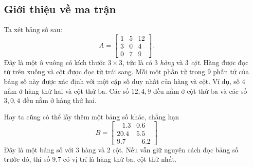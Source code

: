 \subsection{Giới thiệu về ma trận}
Ta xét bảng số sau:
\[ A=
\begin{bmatrix}
    1&5&12\\
    3&0&4\\
    0&7&9
\end{bmatrix}.
\]
Đây là một ô vuông có kích thước \(3\times 3\), tức là có \(3\) \emph{hàng} và \(3\) \emph{cột}. Hàng được đọc từ trên xuống và cột được đọc từ trái sang. Mỗi một phần tử  trong \(9\) phần tử  của bảng số này được xác định với một cặp số duy nhất của hàng và cột. Ví dụ, số \(4\) nằm ở hàng thứ hai và cột thứ ba. 
Các số \(12,4,9\) đều nằm ở cột thứ ba và các số \(3,0,4\) đều nằm ở hàng thứ hai. 

Hay ta cũng có thể lấy thêm một bảng số khác, chẳng hạn
\[B=\begin{bmatrix}
    -1.3&0.6\\
    20.4&5.5\\
    9.7&-6.2
\end{bmatrix}\] Đây là một bảng số với \(3\) hàng và \(2\) cột. Nếu vẫn giữ nguyên cách đọc bảng số trước đó, thì số \(9.7\) có vị trí là hàng thứ ba, cột thứ nhất. 

